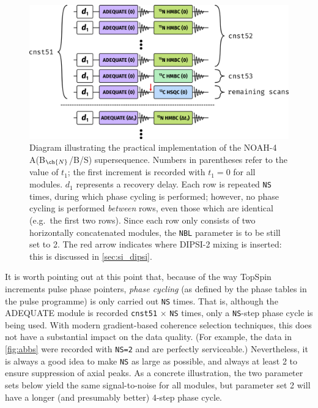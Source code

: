 \documentclass[a4paper,12pt]{article}
\newcommand{\abnbs}{NOAH-4 A(B$_{\ch{N}}$/B/S)}
\begin{document}
\begin{refsection}
\begin{figure}[!ht]
    \centering
    \includegraphics[scale=1.2]{figures/abbs_pp.png}%
    \caption[]{
        Diagram illustrating the practical implementation of the \abnbs{} supersequence.
        Numbers in parentheses refer to the value of $t_1$; the first increment is recorded with $t_1 = 0$ for all modules.
        $d_1$ represents a recovery delay.
        Each row is repeated \texttt{NS} times, during which phase cycling is performed; however, no phase cycling is performed \textit{between} rows, even those which are identical (e.g.\ the first two rows).
        Since each row only consists of two horizontally concatenated modules, the \texttt{NBL} parameter is to be still set to 2.
        The red arrow indicates where DIPSI-2 mixing is inserted: this is discussed in \cref{sec:si_dipsi}.
    }
    \label{fig:abbs_pp}
\end{figure}

It is worth pointing out at this point that, because of the way TopSpin increments pulse phase pointers, \textit{phase cycling} (as defined by the phase tables in the pulse programme) is only carried out \texttt{NS} times.
That is, although the ADEQUATE module is recorded \texttt{cnst51} $\times$ \texttt{NS} times, only a \texttt{NS}-step phase cycle is being used.
With modern gradient-based coherence selection techniques, this does not have a substantial impact on the data quality.
(For example, the data in \cref{fig:abbs} were recorded with \texttt{NS=2} and are perfectly serviceable.)
Nevertheless, it is always a good idea to make \texttt{NS} as large as possible, and always at least 2 to ensure suppression of axial peaks.
As a concrete illustration, the two parameter sets below yield the same signal-to-noise for all modules, but parameter set 2 will have a longer (and presumably better) 4-step phase cycle.


\end{refsection}
\end{document}
